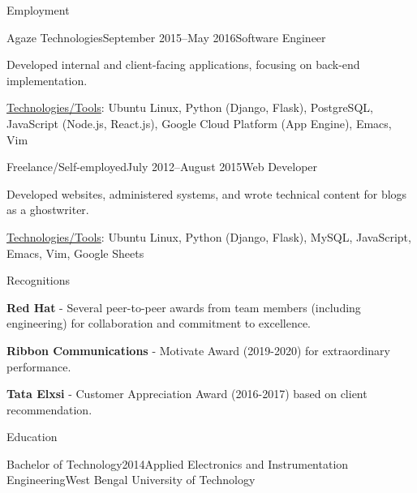 \documentclass{resume} %
\begin{document}
\begin{rSection}{Employment}

\begin{rSubsection}{Agaze Technologies}{September 2015–May 2016}{Software Engineer}{}
\item Developed internal and client-facing applications, focusing on back-end implementation.
\item \underline{Technologies/Tools}: Ubuntu Linux, Python (Django, Flask), PostgreSQL, JavaScript (Node.js, React.js), Google Cloud Platform (App Engine), Emacs, Vim
\end{rSubsection}


\begin{rSubsection}{Freelance/Self-employed}{July 2012–August 2015}{Web Developer}{}
\item Developed websites, administered systems, and wrote technical content for blogs as a ghostwriter.
\item \underline{Technologies/Tools}: Ubuntu Linux, Python (Django, Flask), MySQL, JavaScript, Emacs, Vim, Google Sheets
\end{rSubsection}

\end{rSection}


\begin{rSection}{Recognitions}

\item {\bf Red Hat} - Several peer-to-peer awards from team members (including engineering) for collaboration and commitment to excellence.
\item {\bf Ribbon Communications} - Motivate Award (2019-2020) for extraordinary performance.
\item {\bf Tata Elxsi} - Customer Appreciation Award (2016-2017) based on client recommendation.

\end{rSection}


\begin{rSection}{Education}

\begin{rSubsection}{Bachelor of Technology}{2014}{Applied Electronics and Instrumentation Engineering}{West Bengal University of Technology}
\end{rSubsection}

\end{rSection}

\end{document}
